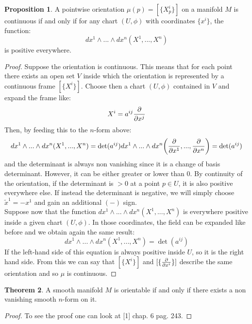 \documentclass[12pt,a4paper]{report}
\theoremstyle{definition}
\newtheorem{Def}{Definition}[chapter]
\theoremstyle{Theorem}
\newtheorem{Theo}[Def]{Theorem}
\newtheorem{Prop}[Def]{Proposition}
\theoremstyle{definition}
\theoremstyle{definition}
\begin{document}
	\begin{Prop}
		A pointwise orientation $\mu(p)=[\{X^i_p\}]$ on a manifold $M$ is continuous if and only if for any chart $(U,\phi)$ with coordinates $\{x^i\}$, the function:
		$$dx^1\wedge...\wedge dx^n(X^1,...,X^n)$$
		is positive everywhere.
	\end{Prop}
	\begin{proof}
		Suppose the orientation is continuous. This means that for each point there exists an open set $V$ inside which the orientation is represented by a continuous frame $[\{X^i\}]$. Choose then a chart $(U,\phi)$ contained in $V$ and expand the frame like:
		$$X^i=a^{ij}{\partial\over \partial x^j}$$
		Then, by feeding this to the $n$-form above:
		$$dx^1\wedge...\wedge dx^n(X^1,...,X^n)=\det(a^{ij})dx^1\wedge...\wedge dx^n\bigg({\partial\over \partial x^1},...,{\partial\over \partial x^n}\bigg)=\det(a^{ij})$$
		and the determinant is always non vanishing since it is a change of basis determinant. However, it can be either greater or lower than 0. By continuity of the orientation, if the determinant is $>0$ at a point $p\in U$, it is also positive everywhere else. If instead the determinant is negative, we will simply choose $\tilde{x}^1=-x^1$ and gain an additional $(-)$ sign.\\
		Suppose now that the function $dx^1\wedge...\wedge dx^n(X^1,...,X^n)$ is everywhere positive inside a given chart $(U,\phi)$. In those coordinates, the field can be expanded like before and we obtain again the same result:
		$$dx^1\wedge...\wedge dx^n(X^1,...,X^n)=\det(a^{ij})$$
		If the left-hand side of this equation is always positive inside $U$, so it is the right hand side. From this we can say that $[\{X^i\}]$ and $[\{{\partial\over\partial x^i}\}]$ describe the same orientation and so $\mu$ is continuous.
	\end{proof}
	\begin{Theo}
		A smooth manifold $M$ is orientable if and only if there exists a non vanishing smooth $n$-form on it.
	\end{Theo}
	\begin{proof}
		To see the proof one can look at [1] chap. 6 pag. 243.
	\end{proof}
	\begin{comment}
		We now define a very important form on metric manifolds, called volume form. This will be crucial in the definition of the Hodge operator.
		\begin{Def}
			Let $(M,g)$ be a smooth metric manifold and $(U,\phi)$ a chart with coordinates $\partial\over \partial x^i$. We define the volume form as:
			$$\omega=\sqrt{|det(g^{ij})|}dx^1\wedge...\wedge dx^n$$
		\end{Def}
		This is clearly a nowhere vanishing form. It can be shown that, by applying the Gram–Schmidt process, the volume form takes the simpler form:
		$$\omega=de^1\wedge...\wedge de^n$$
		where $e^i$ is the orthonormal basis with respect to $g$ inside $U$. The proof is just a straightforward calculation and can be found in [2] chap. 3 pag. 134.
	\end{comment}
\end{document}
